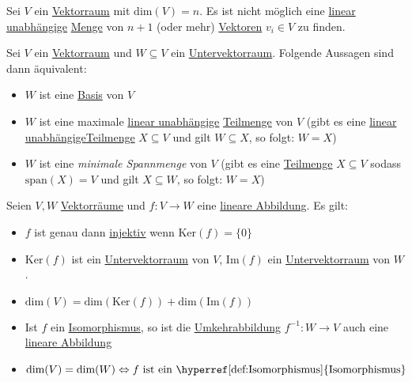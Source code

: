 \documentclass[../../main.tex]{subfiles}
\begin{document}
	\begin{theorem}
		Sei $V$ ein \hyperref[def:Vektorraum]{Vektorraum} mit $\textrm{dim}(V)=n$. Es ist nicht möglich eine \hyperref[def:LineareUnabhängigkeitMenge]{linear unabhängige} \hyperref[def:Menge]{Menge} von $n+1$ (oder mehr) \hyperref[def:Vektor]{Vektoren} $v_i \in V$ zu finden.
	\end{theorem}

	\begin{theorem}
		Sei $V$ ein \hyperref[def:Vektorraum]{Vektorraum} und $W \subseteq V$ ein \hyperref[def:Untervektorraum]{Untervektorraum}. Folgende Aussagen sind dann äquivalent:
		\begin{itemize}
			\item $W$ ist eine \hyperref[def:Basis]{Basis} von $V$
			\item $W$ ist eine maximale \hyperref[def:LineareUnabhängigkeitMenge]{linear unabhängige} \hyperref[def:Teilmenge]{Teilmenge} von $V$ (gibt es eine \hyperref[def:LineareUnabhängigkeitMenge]{linear unabhängige}\hyperref[def:Teilmenge]{Teilmenge} $X \subseteq V$ und gilt $W \subseteq X$, so folgt: $W = X$)
			\item $W$ ist eine \textit{minimale Spannmenge} von $V$ (gibt es eine \hyperref[def:Teilmenge]{Teilmenge} $X\subseteq V$ sodass $\textrm{span}(X)=V$ und gilt $X \subseteq W$, so folgt: $W = X$)
		\end{itemize}
	\end{theorem}

	\begin{theorem}
		Seien $V, W$ \hyperref[def:Vektorraum]{Vektorräume} und $f: V \rightarrow W$ eine \hyperref[def:LineareAbbildung]{lineare Abbildung}. Es gilt:
		\begin{itemize}
			\item $f$ ist genau dann \hyperref[def:Injektiv]{injektiv} wenn $\textrm{Ker}(f)=\{0\}$
			\item $\textrm{Ker}(f)$ ist ein \hyperref[def:Untervektorraum]{Untervektorraum} von $V$, $\textrm{Im}(f)$ ein \hyperref[def:Untervektorraum]{Untervektorraum} von $W$. 
			\item $\textrm{dim}(V) = \textrm{dim}(\textrm{Ker}(f)) + \textrm{dim}(\textrm{Im}(f))$
			\item Ist $f$ ein \hyperref[def:Isomorphismus]{Isomorphismus}, so ist die \hyperref[def:Umkehrabbildung]{Umkehrabbildung} $f^{-1}: W \rightarrow V$ auch eine \hyperref[def:LineareAbbildung]{lineare Abbildung}
			\item $\textrm{dim}(V)=\textrm{dim}(W) \Leftrightarrow f \textrm{ ist ein \hyperref[def:Isomorphismus]{Isomorphismus}}$
		\end{itemize}
	\end{theorem}
\end{document}
